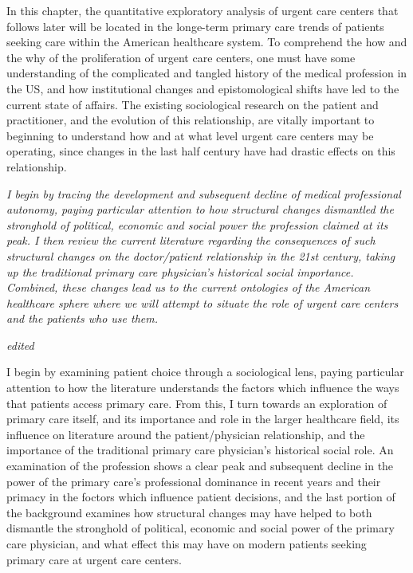 \documentclass[12pt,twoside]{reedthesis}
\begin{document}
  In this chapter, the quantitative exploratory analysis of urgent care
  centers that follows later will be located in the longe-term primary
  care trends of patients seeking care within the American healthcare
  system. To comprehend the how and the why of the proliferation of urgent
  care centers, one must have some understanding of the complicated and
  tangled history of the medical profession in the US, and how
  institutional changes and epistomological shifts have led to the current
  state of affairs. The existing sociological research on the patient and
  practitioner, and the evolution of this relationship, are vitally
  important to beginning to understand how and at what level urgent care
  centers may be operating, since changes in the last half century have
  had drastic effects on this relationship.
  
  \emph{I begin by tracing the development and subsequent decline of
  medical professional autonomy, paying particular attention to how
  structural changes dismantled the stronghold of political, economic and
  social power the profession claimed at its peak. I then review the
  current literature regarding the consequences of such structural changes
  on the doctor/patient relationship in the 21st century, taking up the
  traditional primary care physician's historical social importance.
  Combined, these changes lead us to the current ontologies of the
  American healthcare sphere where we will attempt to situate the role of
  urgent care centers and the patients who use them.}
  
  \emph{edited}
  
  I begin by examining patient choice through a sociological lens, paying
  particular attention to how the literature understands the factors which
  influence the ways that patients access primary care. From this, I turn
  towards an exploration of primary care itself, and its importance and
  role in the larger healthcare field, its influence on literature around
  the patient/physician relationship, and the importance of the
  traditional primary care physician's historical social role. An
  examination of the profession shows a clear peak and subsequent decline
  in the power of the primary care's professional dominance in recent
  years and their primacy in the foctors which influence patient
  decisions, and the last portion of the background examines how
  structural changes may have helped to both dismantle the stronghold of
  political, economic and social power of the primary care physician, and
  what effect this may have on modern patients seeking primary care at
  urgent care centers.
  
\end{document}
